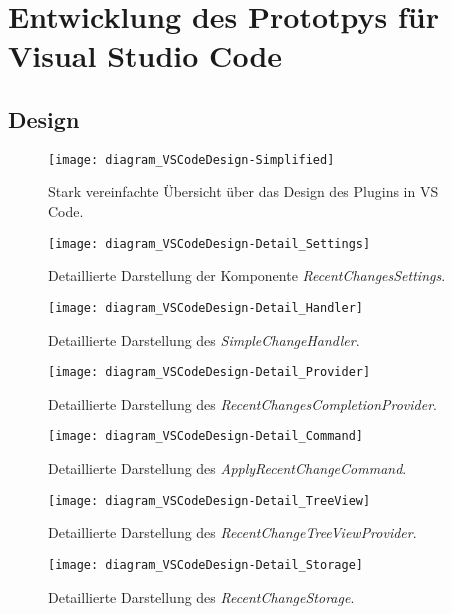 \chapter{Entwicklung des Prototpys für Visual Studio Code}
\label{cha:EntwicklungVsCode}

\section{Design}
\label{sec:EntwicklungVsCode_Design}

\begin{figure}
    \centering
    \texttt{[image: diagram\_VSCodeDesign-Simplified]}
    \caption{Stark vereinfachte Übersicht über das Design des Plugins in  VS Code.}
    \label{fig:diagram_VSCodeDesign-Simplified}
\end{figure}   
\begin{figure}
    \centering
    \texttt{[image: diagram\_VSCodeDesign-Detail\_Settings]}
    \caption{Detaillierte Darstellung der Komponente \emph{RecentChangesSettings}.}
    \label{fig:diagram_VSCodeDesign-Detail_Settings}
\end{figure}   
\begin{figure}
    \centering
    \texttt{[image: diagram\_VSCodeDesign-Detail\_Handler]}
    \caption{Detaillierte Darstellung des \emph{SimpleChangeHandler}.}
    \label{fig:diagram_VSCodeDesign-Detail_Handler}
\end{figure}   
\begin{figure}
    \centering
    \texttt{[image: diagram\_VSCodeDesign-Detail\_Provider]}
    \caption{Detaillierte Darstellung des \emph{RecentChangesCompletionProvider}.}
    \label{fig:diagram_VSCodeDesign-Detail_Provider}
\end{figure}   
\begin{figure}
    \centering
    \texttt{[image: diagram\_VSCodeDesign-Detail\_Command]}
    \caption{Detaillierte Darstellung des \emph{ApplyRecentChangeCommand}.}
    \label{fig:diagram_VSCodeDesign-Detail_Command}
\end{figure}   
\begin{figure}
    \centering
    \texttt{[image: diagram\_VSCodeDesign-Detail\_TreeView]}
    \caption{Detaillierte Darstellung des \emph{RecentChangeTreeViewProvider}.}
    \label{fig:diagram_VSCodeDesign-Detail_TreeView}
\end{figure}   
\begin{figure}
    \centering
    \texttt{[image: diagram\_VSCodeDesign-Detail\_Storage]}
    \caption{Detaillierte Darstellung des \emph{RecentChangeStorage}.}
    \label{fig:diagram_VSCodeDesign-Detail_Storage}
\end{figure}   

